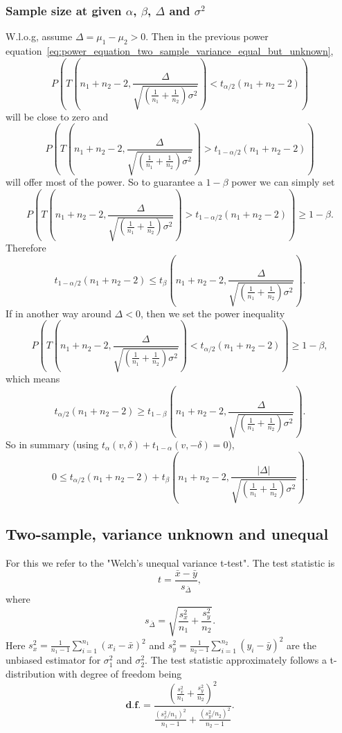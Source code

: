 \documentclass[a4paper,12pt]{article}
\begin{document}
\subsubsection{Sample size at given $\alpha$, $\beta$, $\Delta$ and $\sigma^2$}
\label{sec:sample-size-at-3}

W.l.o.g, assume $\Delta = \mu_1 - \mu_2 > 0$. Then in the previous power equation~\eqref{eq:power_equation_two_sample_variance_equal_but_unknown},
\[
  P\left(
    T{\left(
        n_1 + n_2 - 2,
        \frac{\Delta}{\sqrt{\left(\frac{1}{n_1} + \frac{1}{n_2}\right)\sigma^2}}
      \right)}
    < t_{\alpha / 2}\left(n_1 + n_2 - 2\right)
  \right)
\]
will be close to zero and
\[
  P\left(
    T{\left(
        n_1 + n_2 - 2,
        \frac{\Delta}{\sqrt{\left(\frac{1}{n_1} + \frac{1}{n_2}\right)\sigma^2}}
      \right)}
    > t_{1 - \alpha / 2}\left(n_1 + n_2 - 2\right)
  \right) 
\]
will offer most of the power. So to guarantee a $1 - \beta$ power we can simply set
\[
  P\left(
    T{\left(
        n_1 + n_2 - 2,
        \frac{\Delta}{\sqrt{\left(\frac{1}{n_1} + \frac{1}{n_2}\right)\sigma^2}}
      \right)}
    > t_{1 - \alpha / 2}\left(n_1 + n_2 - 2\right)
  \right)
  \geq 1 - \beta
  .
\]
Therefore
\[
  t_{1 - \alpha / 2}\left(n_1 + n_2 - 2\right)
  \leq
  t_{\beta}\left(
    n_1 + n_2 - 2,
    \frac{\Delta}{\sqrt{\left(\frac{1}{n_1} + \frac{1}{n_2}\right)\sigma^2}}
  \right)
  .
\]
If in another way around $\Delta < 0$, then we set the power inequality
\[
  P\left(
    T{\left(
        n_1 + n_2 - 2,
        \frac{\Delta}{\sqrt{\left(\frac{1}{n_1} + \frac{1}{n_2}\right)\sigma^2}}
      \right)}
    < t_{\alpha / 2}\left(n_1 + n_2 - 2\right)
  \right)
  \geq 1 - \beta
  ,
\]
which means
\[
  t_{\alpha / 2}\left(n_1 + n_2 - 2\right)
  \geq
  t_{1 - \beta}\left(
    n_1 + n_2 - 2,
    \frac{\Delta}{\sqrt{\left(\frac{1}{n_1} + \frac{1}{n_2}\right)\sigma^2}}
  \right)
  .
\]
So in summary (using $t_{\alpha}\left(v, \delta\right) + t_{1 - \alpha}\left(v, -\delta\right) = 0$),
\[
  0
  \leq
  t_{\alpha / 2}\left(n_1 + n_2 - 2\right)
  + t_{\beta}\left(
    n_1 + n_2 - 2,
    \frac{\left|\Delta\right|}{\sqrt{\left(\frac{1}{n_1} + \frac{1}{n_2}\right)\sigma^2}}
  \right)
  .
\]

\subsection{Two-sample, variance unknown and unequal}
\label{sec:two-sample-variance-2}

For this we refer to the "Welch's unequal variance t-test"\citep{WELCH1947p28-35}. The test statistic is
\[
  t = \frac{\bar{x} - \bar{y}}{s_{\bar{\Delta}}}
  ,
\]
where
\[
  s_{\bar{\Delta}} = \sqrt{
    \frac{s_x^2}{n_1} + \frac{s_y^2}{n_2}
  }
  .
\]
Here $s_x^2 = \frac{1}{n_1 - 1}\sum\limits_{i = 1}^{n_1}\left(x_i - \bar{x}\right)^2$ and $s_y^2 = \frac{1}{n_2- 1}\sum\limits_{i = 1}^{n_2}\left(y_i - \bar{y}\right)^2$ are the unbiased estimator for $\sigma_1^2$ and $\sigma_2^2$. The test statistic approximately follows a t-distribution with degree of freedom being
\[
  \mathbf{d.f.} = \frac{
    \left(\frac{s_x^2}{n_1} + \frac{s_y^2}{n_2}\right)^2
  }{
    \frac{\left(s_x^2 / n_1\right)^2}{n_1 - 1}
    + \frac{\left(s_y^2 / n_2\right)^2}{n_2 - 1}
  }
  .
\]




\end{document}
